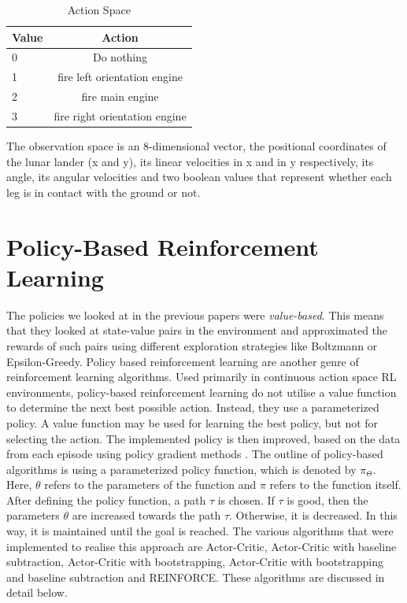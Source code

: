 \documentclass{article}
\begin{document}
\begin{table}[htbp]
\centering
\begin{tabular}{|l|c|}
\hline
\textbf{Value} & \textbf{Action} \\
\hline
0  & Do nothing \\
\hline
1 & fire left orientation engine \\
\hline
2  & fire main engine \\
\hline
3 & fire right orientation engine  \\
\hline
\end{tabular}
\caption{Action Space}
\label{tab:hyper-parameters}
\end{table}

The observation space is an 8-dimensional vector, the positional coordinates of the lunar lander (x and y), its linear velocities in x and in y respectively, its angle, its angular velocities and two boolean values that represent whether each leg is in contact with the ground or not. 

\section{Policy-Based Reinforcement Learning}
The policies we looked at in the previous papers were \emph{value-based}. This means that they looked at state-value pairs in the environment and approximated the rewards of such pairs using different exploration strategies like Boltzmann or Epsilon-Greedy. Policy based reinforcement learning are another genre of reinforcement learning algorithms. Used primarily in  continuous action space RL environments, policy-based reinforcement learning do not utilise a value function to determine the next best possible action. Instead, they use a parameterized policy. A value function may be used for learning the best policy, but not for selecting the action. The implemented policy is then improved, based on the data from each episode using policy gradient methods \cite{sutton-barlo}.
The outline of policy-based algorithms is using a parameterized policy function, which is denoted by $\pi_\Theta$. 
Here, $\theta$ refers to the parameters of the function and $\pi$ refers to the function itself. After defining the policy function, a path $\tau$ is chosen. If $\tau$ is good, then the parameters $\theta$ are increased towards the path $\tau$. Otherwise, it is decreased. In this way, it is maintained until the goal is reached.    \cite{plaat-deeprl}
The various algorithms that were implemented to realise this approach are Actor-Critic, Actor-Critic with baseline subtraction, Actor-Critic with bootstrapping, Actor-Critic with bootstrapping and baseline subtraction and REINFORCE. These algorithms are discussed in detail below. 
\end{document}
